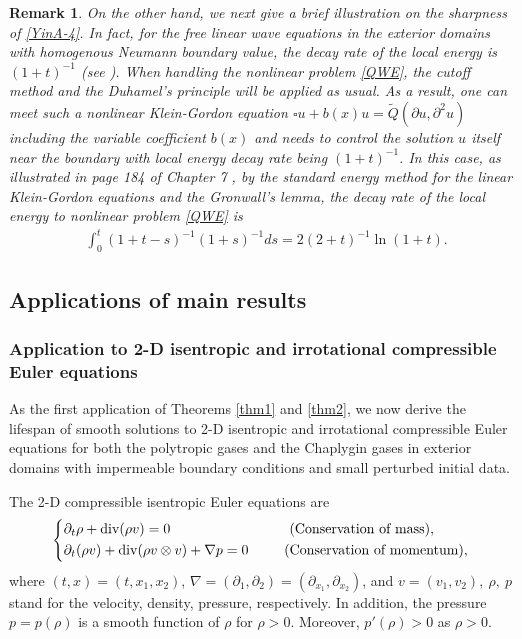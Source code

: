 \documentclass[11pt,twoside]{article}
\def\p{\partial}
\def\dive{\operatorname{div}}
\theoremstyle{plain}
\newtheorem{remark}{Remark}[section]
\theoremstyle{definition}
\numberwithin{equation}{section}
\begin{document}
\begin{remark}
On the other hand, we next give a brief illustration on the sharpness of \eqref{YinA-4}.
In fact, for the free linear wave equations in the exterior domains with homogenous Neumann boundary value,
the decay rate of the local energy is $(1+t)^{-1}$ (see \cite{Kubo13,Morawetz75,Vainberg75}).
When handling the nonlinear problem \eqref{QWE}, the cutoff method and the Duhamel's principle will be applied as usual.
As a result, one can meet such a nonlinear Klein-Gordon equation $\square u+b(x)u={\tilde Q}(\p u, \p^2 u)$
including the variable coefficient $b(x)$ and needs to control the solution $u$ itself near the boundary with local energy decay rate being $(1+t)^{-1}$.
In this case, as illustrated in page 184 of Chapter 7 \cite{Hormander97book}, by the standard energy method for the linear Klein-Gordon
equations and the Gronwall's lemma,
the decay rate of the local energy to nonlinear problem \eqref{QWE} is
\begin{align*}
&\int_0^t(1+t-s)^{-1}(1+s)^{-1}ds=2(2+t)^{-1}\ln(1+t).
\end{align*}
\end{remark}

\subsection{Applications of main results}

\subsubsection{Application to 2-D isentropic
and irrotational compressible Euler equations}\label{CYJ-1}

As the first application of Theorems \ref{thm1} and \ref{thm2}, we now derive the lifespan
of smooth solutions to 2-D isentropic
and irrotational compressible Euler equations for both the polytropic gases and the Chaplygin
gases in exterior domains with impermeable boundary conditions and small perturbed initial data.


The 2-D compressible isentropic Euler equations are
\begin{equation}\label{Euler}
\left\{
\begin{aligned}
&\p_t\rho+\dive (\rho v)=0\hspace{3cm}\text{(Conservation of mass)},\\
&\p_t(\rho v)+\dive (\rho v \otimes v)+\nabla p=0
\hspace{0.9cm}\text{(Conservation of momentum)},\\
\end{aligned}
\right.
\end{equation}
where $(t,x)=(t, x_1, x_2)$, $\nabla=(\p_1, \p_2)=(\p_{x_1}, \p_{x_2})$,
and $v=(v_1,v_2),~\rho,~p$ stand for the velocity, density, pressure, respectively.
In addition, the pressure $p=p(\rho)$ is a smooth
function of $\rho$ for $\rho>0$.
Moreover, $p'(\rho)>0$ as $\rho>0$.
\end{document}
